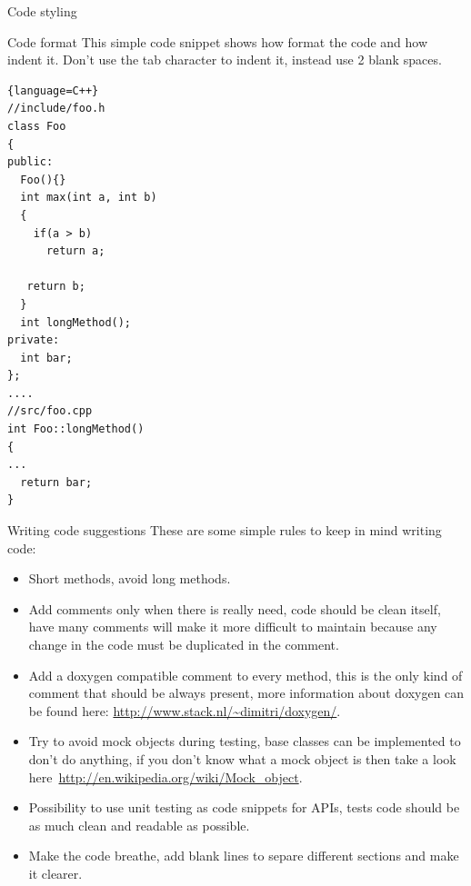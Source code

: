 \documentclass[12pt]{article}
\begin{document}
\begin{section}{Code styling}
\begin{subsection}{Code format}
This simple code snippet shows how format the code and how indent it.
Don't use the tab character to indent it, instead use 2 blank spaces. 
\begin{lstlisting}{language=C++}
//include/foo.h
class Foo
{
public:
  Foo(){}
  int max(int a, int b)
  {
    if(a > b)
      return a;

   return b;
  }
  int longMethod();
private:
  int bar;
};
....
//src/foo.cpp
int Foo::longMethod()
{
...
  return bar;
}
\end{lstlisting}
\end{subsection}

\begin{subsection}{Writing code suggestions}
These are some simple rules to keep in mind writing code:
\begin{itemize}
\item Short methods, avoid long methods.
\item Add comments only when there is really need, code should be
  clean itself, have many comments will make it more difficult to
  maintain because any change in the code must be duplicated in the
  comment.
\item Add a doxygen compatible comment to every method, this is the
  only kind of comment that should be always present, more information
  about doxygen can be found here:
  \url{http://www.stack.nl/~dimitri/doxygen/}.
\item Try to avoid mock objects during testing, base classes can be
  implemented to don't do anything, if you don't know what a mock
  object is then take a look
  here~\url{http://en.wikipedia.org/wiki/Mock_object}.
\item Possibility to use unit testing as code snippets for APIs, tests
  code should be as much clean and readable as possible.
\item Make the code breathe, add blank lines to separe different
  sections and make it clearer.
\end{itemize}
\end{subsection}
\end{section}
\clearpage
\end{document}
